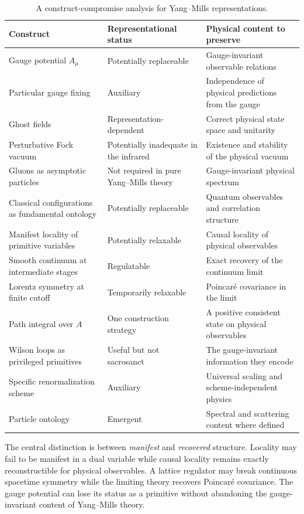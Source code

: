 \documentclass[11pt]{article}
\begin{document}
\begin{table}[ht]
\centering
\small
\renewcommand{\arraystretch}{1.22}
\begin{tabularx}{\textwidth}{>{\raggedright\arraybackslash}p{}
>{\raggedright\arraybackslash}p{}X}
\toprule
\textbf{Construct} & \textbf{Representational status} &
\textbf{Physical content to preserve} \\
\midrule
Gauge potential $A_\mu$
  & Potentially replaceable
  & Gauge-invariant observable relations \\
Particular gauge fixing
  & Auxiliary
  & Independence of physical predictions from the gauge \\
Ghost fields
  & Representation-dependent
  & Correct physical state space and unitarity \\
Perturbative Fock vacuum
  & Potentially inadequate in the infrared
  & Existence and stability of the physical vacuum \\
Gluons as asymptotic particles
  & Not required in pure Yang--Mills theory
  & Gauge-invariant physical spectrum \\
Classical configurations as fundamental ontology
  & Potentially replaceable
  & Quantum observables and correlation structure \\
Manifest locality of primitive variables
  & Potentially relaxable
  & Causal locality of physical observables \\
Smooth continuum at intermediate stages
  & Regulatable
  & Exact recovery of the continuum limit \\
Lorentz symmetry at finite cutoff
  & Temporarily relaxable
  & Poincar\'e covariance in the limit \\
Path integral over $A$
  & One construction strategy
  & A positive consistent state on physical observables \\
Wilson loops as privileged primitives
  & Useful but not sacrosanct
  & The gauge-invariant information they encode \\
Specific renormalization scheme
  & Auxiliary
  & Universal scaling and scheme-independent physics \\
Particle ontology
  & Emergent
  & Spectral and scattering content where defined \\
\bottomrule
\end{tabularx}
\caption{A construct-compromise analysis for Yang--Mills representations.}
\label{tab:compromise}
\end{table}

The central distinction is between \emph{manifest} and \emph{recovered}
structure.  Locality may fail to be manifest in a dual variable while causal
locality remains exactly reconstructible for physical observables.  A lattice
regulator may break continuous spacetime symmetry while the limiting theory
recovers Poincar\'e covariance.  The gauge potential can lose its status as a
primitive without abandoning the gauge-invariant content of Yang--Mills theory.
\end{document}
